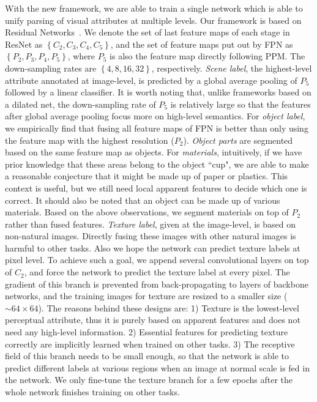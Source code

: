 \documentclass[runningheads]{llncs}
\begin{document}
With the new framework, we are able to train a single network which is able to unify parsing of visual attributes at multiple levels. Our framework is based on Residual Networks~\cite{he2016deep}. We denote the set of last feature maps of each stage in ResNet as $\left\{ C_2, C_3, C_4, C_5\right\}$, and the set of feature maps put out by FPN as $\left\{ P_2, P_3, P_4, P_5 \right\}$, where $P_5$ is also the feature map directly following PPM. The down-sampling rates are $\left\{ 4, 8, 16, 32\right\}$, respectively. \emph{Scene label}, the highest-level attribute annotated at image-level, is predicted by a global average pooling of $P_5$ followed by a linear classifier. It is worth noting that, unlike frameworks based on a dilated net, the down-sampling rate of $P_5$ is relatively large so that the features after global average pooling focus more on high-level semantics. For \emph{object label}, we empirically find that fusing all feature maps of FPN is better than only using the feature map with the highest resolution ($P_2$). \emph{Object parts} are segmented based on the same feature map as objects. For \emph{materials}, intuitively, if we have prior knowledge that these areas belong to the object ``cup", we are able to make a reasonable conjecture that it might be made up of paper or plastics. This context is useful, but we still need local apparent features to decide which one is correct. It should also be noted that an object can be made up of various materials. Based on the above observations, we segment materials on top of $P_2$ rather than fused features. \emph{Texture label}, given at the image-level, is based on non-natural images. Directly fusing these images with other natural images is harmful to other tasks. Also we hope the network can predict texture labels at pixel level. To achieve such a goal, we append several convolutional layers on top of $C_2$, and force the network to predict the texture label at every pixel. The gradient of this branch is prevented from back-propagating to layers of backbone networks, and the training images for texture are resized to a smaller size ($\sim{}64\times{}64$). The reasons behind these designs are: 1) Texture is the lowest-level perceptual attribute, thus it is purely based on apparent features and does not need any high-level information. 2) Essential features for predicting texture correctly are implicitly learned when trained on other tasks. 3) The receptive field of this branch needs to be small enough, so that the network is able to predict different labels at various regions when an image at normal scale is fed in the network. We only fine-tune the texture branch for a few epochs after the whole network finishes training on other tasks.
\end{document}
